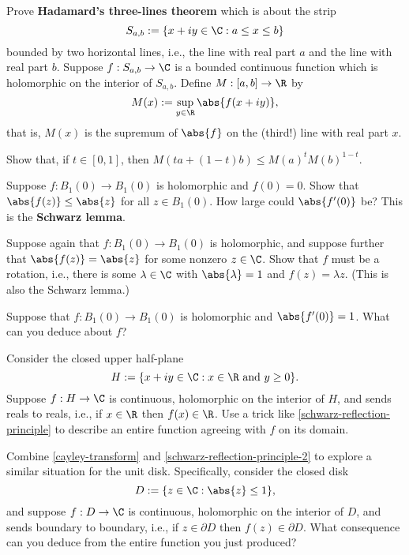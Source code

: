 \documentclass{homework}
\begin{document}
\begin{problem}\label{hadamard-three-lines}Prove \textbf{Hadamard's
    three-lines theorem} which is about the strip
  \[
    S_{a,b} := \{ x+iy \in \C : a \leq x \leq b\}
  \]
  bounded by two horizontal lines, i.e., the line with real part $a$
  and the line with real part $b$.  Suppose $f : S_{a,b} \to \C$ is a
  bounded continuous function which is holomorphic on the interior of
  $S_{a,b}$.  Define $M : [a,b] \to \R$ by
  \[
    M(x) := \sup_{y \in \R} \abs{f(x+iy)},
  \]
  that is, $M(x)$ is the supremum of $\abs{f}$ on the (third!) line with real part $x$.
  
  Show that, if $t \in [0,1]$, then \(M\left( ta + (1-t)b \right) \leq M(a)^t M(b)^{1-t}\).
\end{problem}

\begin{problem}\label{schwarz-lemma}Suppose $f : B_1(0) \to B_1(0)$ is holomorphic and $f(0) = 0$.  Show
  that $\abs{f(z)} \leq \abs{z}$ for all $z \in B_1(0)$.  How large
  could $\abs{f'(0)}$ be?  This is the \textbf{Schwarz lemma}.
\end{problem}

\begin{problem}\label{schwarz-lemma-2}Suppose again that $f : B_1(0) \to B_1(0)$ is holomorphic, and
  suppose further that $\abs{f(z)} = \abs{z}$ for some nonzero
  $z \in \C$.  Show that $f$ must be a rotation, i.e., there is some
  $\lambda \in \C$ with $\abs{\lambda} = 1$ and $f(z) = \lambda z$.
  (This is also the Schwarz lemma.)
\end{problem}

\begin{problem}\label{schwarz-lemma-3}Suppose that
  $f : B_1(0) \to B_1(0)$ is holomorphic and $\abs{f'(0)} = 1$.  What
  can you deduce about $f$?
\end{problem}

\begin{problem}\label{schwarz-reflection-principle-2}Consider the
  closed upper half-plane
  \[
    H := \{ x + iy \in \C : x \in \R \mbox{ and } y \geq 0 \}.
  \]
  Suppose $f : H \to \C$ is continuous, holomorphic on the interior of
  $H$, and sends reals to reals, i.e., if $x \in \R$ then
  $f(x) \in \R$.  Use a trick like \ref{schwarz-reflection-principle}
  to describe an entire function agreeing with $f$ on its domain.
\end{problem}

\begin{problem}
  Combine \ref{cayley-transform} and
  \ref{schwarz-reflection-principle-2} to explore a similar situation
  for the unit disk.  Specifically, consider the closed disk
  \[
    D := \{ z \in \C : \abs{z} \leq 1 \},
  \]
  and suppose $f : D \to \C$ is continuous, holomorphic on the
  interior of $D$, and sends boundary to boundary, i.e., if
  $z \in \partial D$ then $f(z) \in \partial D$.  What consequence can
  you deduce from the entire function you just produced?
\end{problem}
\end{document}
